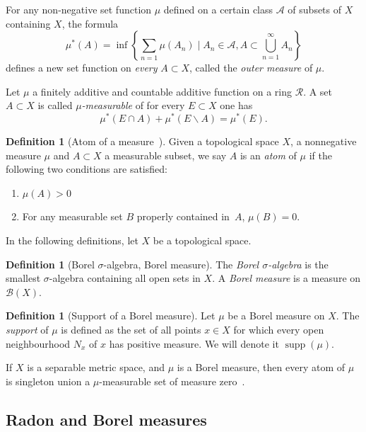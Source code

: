 \documentclass[11pt]{amsart}
\numberwithin{equation}{section}
\numberwithin{figure}{section}
\theoremstyle{definition}
\newtheorem{definition}[theorem]{Definition}
\theoremstyle{plain}
\DeclareMathOperator{\supp}{supp}
\begin{document}
For any non-negative set function $\mu$ defined on a certain class $\mathcal{A}$ of subsets of $X$ containing $X$, the formula
\[
\mu^*(A) = \inf \left\{ \sum_{n=1} \mu(A_n) \mid A_n \in \mathcal{A}, A \subset \bigcup_{n=1}^{\infty} A_n \right\}
\]
defines a new set function on \emph{every} $A \subset X$, called the \emph{outer measure} of $\mu$.

Let $\mu$ a finitely additive and countable additive function on a ring $\mathcal{R}$. A set $A \subset X$ is called \emph{$\mu$-measurable} of for every $E \subset X$ one has
\[
\mu^*(E \cap A) + \mu^*(E \backslash A) = \mu^*(E).
\]

\begin{definition}[{Atom of a measure~\cite[Definition~1.12.7]{Bo07:MeasureTheory}}]
Given a topological space $X$, a nonnegative measure $\mu$ and $A\subset X$ a measurable subset, we say $A$ is an \emph{atom} of $\mu$ if the following two conditions are satisfied:
\begin{enumerate}
    \item $\mu(A) > 0$
    \item For any measurable set $B$ properly contained in~$A$, $\mu(B)=0$.
\end{enumerate}
\label{def:atommeasure}
\end{definition}

In the following definitions, let $X$ be a topological space.

\begin{definition}[Borel $\sigma$-algebra, Borel measure]
The \emph{Borel $\sigma$-algebra} is the smallest $\sigma$-algebra containing all open sets in $X$. A \emph{Borel measure} is a measure on $\mathcal{B}(X)$.
\end{definition}

\begin{definition}[Support of a Borel measure]
Let $\mu$ be a Borel measure on $X$. The \emph{support} of $\mu$ is defined as the set of all points $x \in X$ for which every open neighbourhood $N_x$ of $x$ has positive measure. We will denote it $\supp(\mu)$.
\label{def:support}
\end{definition}

If $X$ is a separable metric space, and $\mu$ is a Borel measure, then every atom of $\mu$ is singleton union a $\mu$-measurable set of measure zero~\cite[2.1.6, Theorem~2]{Kad18:MeasureTheory}.

\subsection{Radon and Borel measures}
\label{subsec:RadonvsBorel}
\end{document}
